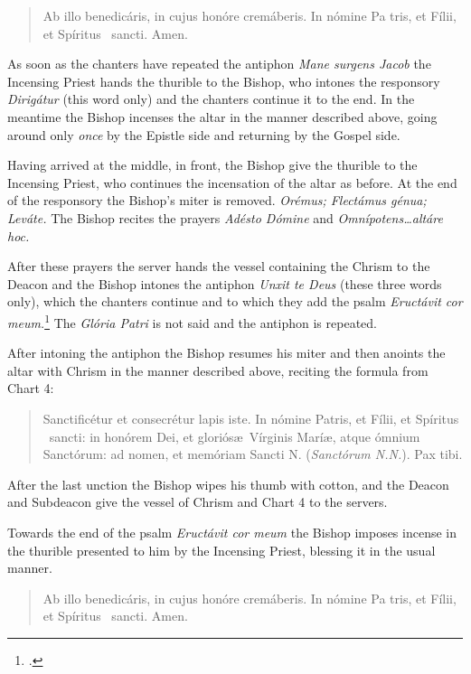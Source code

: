 \documentclass[letterpaper]{report}
\newcommand\blessincense{
\begin{quote}
   Ab illo benedicáris, in cujus honóre cremáberis. In nómine Pa\cross
    tris, et Fí\cross lii, et Spíritus \cross\ sancti. \rbar Amen.
\end{quote}
}
\begin{document}
{    \blessincense

    As soon as the chanters have repeated the antiphon \textit{Mane surgens
    Jacob} the Incensing Priest hands the thurible to the Bishop, who intones
    the responsory \textit{Dirig\'atur} (this word only) and the chanters
    continue it to the end. In the meantime the Bishop incenses the altar in
    the manner described above, going around only \textit{once} by the Epistle
    side and returning by the Gospel side.

    \rubric Having arrived at the middle, in front, the Bishop give the
    thurible to the Incensing Priest, who continues the incensation of the
    altar as before. At the end of the responsory the Bishop's miter is
    removed. \textit{Orémus; Flectámus génua; Leváte.} The Bishop recites the
    prayers \textit{Adésto Dómine} and \textit{Omnípotens\dots altáre hoc.}

    \rubric After these prayers the server hands the vessel containing the
    Chrism to the Deacon and the Bishop intones the antiphon \textit{Unxit te
    Deus} (these three words only), which the chanters continue and to which
    they add the psalm \textit{Eructávit cor meum.}\footcite[The antiphon
    \textit{Unxit te Deus} may be repested after each verse of this
    psalm.][footnote 1, p. 104.]{consecranda} The \textit{Gl\'oria Patri} is not
    said and the antiphon is repeated.

    After intoning the antiphon the Bishop resumes his miter and then anoints
    the altar with Chrism in the manner described above, reciting the formula
    from Chart 4:

    \begin{quote}
        Sancti\cross ficétur et conse\cross crétur lapis iste. In nómine
        Pa\cross tris, et Fí\cross lii, et Spíritus \cross\ sancti: in honórem
        Dei, et gloriós\ae\ Vírginis Marí\ae, atque ómnium Sanctórum: ad nomen,
        et memóriam Sancti N. (\textit{Sanctórum N.N.}). Pax tibi.
    \end{quote}

    After the last unction the Bishop wipes his thumb with cotton, and the
    Deacon and Subdeacon give the vessel of Chrism and Chart 4 to the servers.

    \rubric Towards the end of the psalm \textit{Eruct\'avit cor meum} the Bishop
    imposes incense in the thurible presented to him by the Incensing Priest,
    blessing it in the usual manner. 

    \blessincense

}
\end{document}

